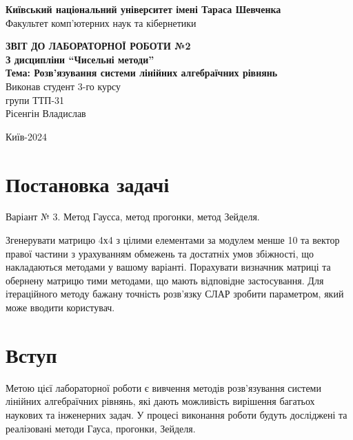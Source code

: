 \documentclass[a4paper, 12pt]{article}
\begin{document}
\begin{titlepage}
	\begin{center}
		\Large
		\textbf{Київський національний університет імені Тараса Шевченка} \\
		Факультет комп'ютерних наук та кібернетики \\

		\vspace{6cm}

		\textbf{\LARGE ЗВІТ ДО ЛАБОРАТОРНОЇ РОБОТИ №2} \\[0.5cm]
		\textbf{З дисципліни ``Чисельні методи''} \\[0.5cm]
		\textbf{Тема: Розв'язування системи лінійних алгебраїчних рівнянь} \\

		\vfill
		\hspace{7cm} Виконав студент 3-го курсу \\
		\hspace{7cm} групи ТТП-31 \\
		\hspace{7cm} Рісенгін Владислав \\
		\vspace{2cm}

		Київ-2024
	\end{center}
\end{titlepage}

\newpage


\section{Постановка задачі}

Варіант № 3. Метод Гаусса, метод прогонки, метод Зейделя.

Згенерувати матрицю 4х4 з цілими елементами за модулем менше 10 та вектор правої частини з урахуванням обмежень та достатніх умов збіжності, що накладаються методами у вашому варіанті. Порахувати визначник матриці та обернену матрицю тими методами, що мають відповідне застосування. Для ітераційного методу бажану точність розв’язку СЛАР зробити параметром, який може вводити користувач.

\section{Вступ}

Метою цієї лабораторної роботи є вивчення методів розв'язування системи лінійних алгебраїчних рівнянь, які дають можливість вирішення багатьох наукових та інженерних задач. У процесі виконання роботи будуть досліджені та реалізовані методи Гауса, прогонки, Зейделя.
\end{document}
